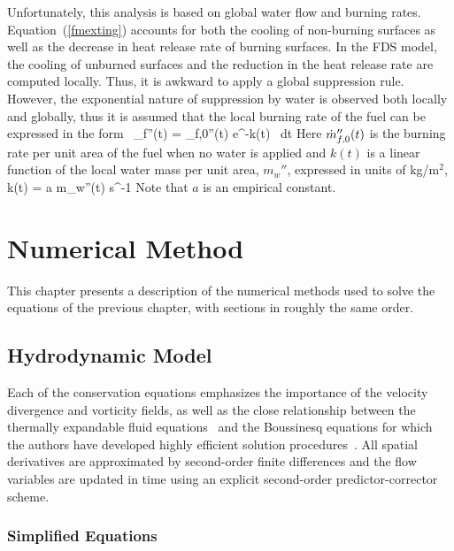 \documentclass[11pt]{book}
\begin{document}
Unfortunately, this analysis is based on global water flow and
burning rates. Equation~(\ref{fmexting})
accounts for both the cooling of non-burning surfaces as well as the
decrease in heat release rate of burning surfaces. In the FDS model,
the cooling of unburned surfaces and the reduction in the heat
release rate are computed locally. Thus, it is awkward to apply a
global suppression rule.
However, the exponential nature of suppression by water is observed
both locally and globally, thus it is assumed that the local burning rate
of the fuel can be expressed in the form~\cite{Hamins:1,Hamins:IAFSS2002}
\be \dm_f''(t) = \dm_{f,0}''(t) \; e^{-\int k(t) \, dt}
\label{nistexting} \ee
Here $\dot{m}_{f,0}''(t)$ is the burning rate per unit area of the fuel
when no water is applied and $k(t)$ is a linear function of the local water
mass per unit area, $m_w''$, expressed in units of kg/m$^2$,
\be k(t) = a \; m_w''(t) \quad   \hbox{s}^{-1} \ee
Note that $a$ is an empirical constant.







\clearpage
\chapter{Numerical Method}

This chapter presents a description of the numerical methods used to solve the equations of the previous chapter, with sections
in roughly the same order.

\section{Hydrodynamic Model}

Each of the conservation equations emphasizes the importance of the velocity
divergence and vorticity fields, as well as the close relationship between
the thermally expandable fluid equations~\cite{Rehm:1} and the Boussinesq
equations for which the authors have developed highly efficient solution
procedures~\cite{McGrattan:1,Baum:1}.
All spatial derivatives are approximated by second-order finite
differences and the flow variables are updated in time using an
explicit second-order predictor-corrector scheme.

\subsection{Simplified Equations}
\end{document}
